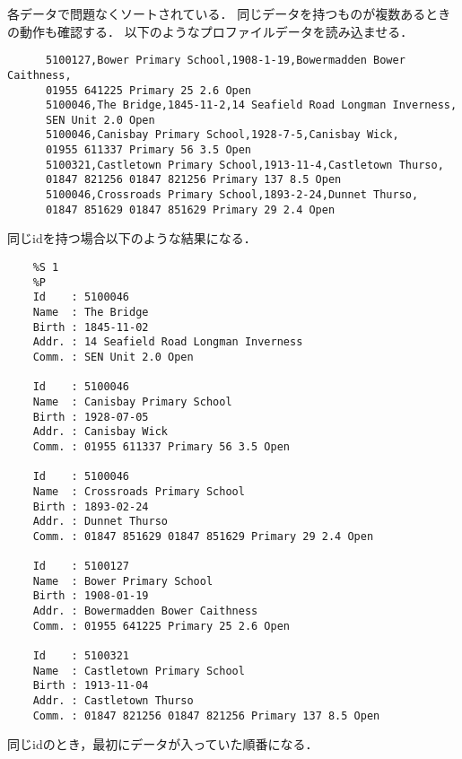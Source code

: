       各データで問題なくソートされている．
      同じデータを持つものが複数あるときの動作も確認する．
      以下のようなプロファイルデータを読み込ませる．
    \begin{verbatim}
      5100127,Bower Primary School,1908-1-19,Bowermadden Bower Caithness,
      01955 641225 Primary 25 2.6 Open
      5100046,The Bridge,1845-11-2,14 Seafield Road Longman Inverness,
      SEN Unit 2.0 Open
      5100046,Canisbay Primary School,1928-7-5,Canisbay Wick,
      01955 611337 Primary 56 3.5 Open
      5100321,Castletown Primary School,1913-11-4,Castletown Thurso,
      01847 821256 01847 821256 Primary 137 8.5 Open
      5100046,Crossroads Primary School,1893-2-24,Dunnet Thurso,
      01847 851629 01847 851629 Primary 29 2.4 Open
    \end{verbatim}
    同じidを持つ場合以下のような結果になる．
    \begin{verbatim}
    %S 1
    %P
    Id    : 5100046
    Name  : The Bridge
    Birth : 1845-11-02
    Addr. : 14 Seafield Road Longman Inverness
    Comm. : SEN Unit 2.0 Open

    Id    : 5100046
    Name  : Canisbay Primary School
    Birth : 1928-07-05
    Addr. : Canisbay Wick
    Comm. : 01955 611337 Primary 56 3.5 Open

    Id    : 5100046
    Name  : Crossroads Primary School
    Birth : 1893-02-24
    Addr. : Dunnet Thurso
    Comm. : 01847 851629 01847 851629 Primary 29 2.4 Open

    Id    : 5100127
    Name  : Bower Primary School
    Birth : 1908-01-19
    Addr. : Bowermadden Bower Caithness
    Comm. : 01955 641225 Primary 25 2.6 Open

    Id    : 5100321
    Name  : Castletown Primary School
    Birth : 1913-11-04
    Addr. : Castletown Thurso
    Comm. : 01847 821256 01847 821256 Primary 137 8.5 Open
    \end{verbatim}
    同じidのとき，最初にデータが入っていた順番になる．
